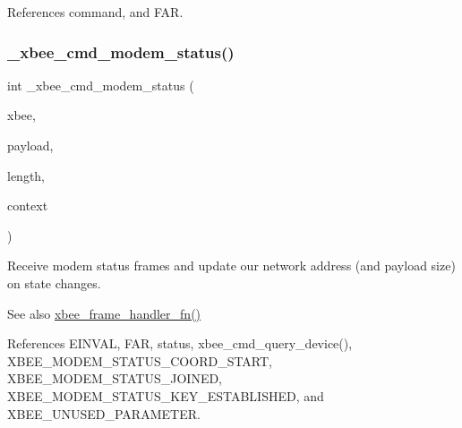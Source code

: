 References command, and F\+AR.

\mbox{\label{group__xbee__atcmd_ga9b0ddf7aae7599dc334304f2b642f05f}} 
\subsubsection{\texorpdfstring{\+\_\+xbee\+\_\+cmd\+\_\+modem\+\_\+status()}{\_xbee\_cmd\_modem\_status()}}
{\footnotesize\ttfamily int \+\_\+xbee\+\_\+cmd\+\_\+modem\+\_\+status (\begin{DoxyParamCaption}\item[{\hyperlink{structxbee__dev__t}{xbee\+\_\+dev\+\_\+t} $\ast$}]{xbee,  }\item[{const void \hyperlink{group__hal_gaef060b3456fdcc093a7210a762d5f2ed}{F\+AR} $\ast$}]{payload,  }\item[{\hyperlink{group__hal__dos_ga5a8b2dc9e45a9ee81a94ef304fb62505}{uint16\+\_\+t}}]{length,  }\item[{void \hyperlink{group__hal_gaef060b3456fdcc093a7210a762d5f2ed}{F\+AR} $\ast$}]{context }\end{DoxyParamCaption})}



Receive modem status frames and update our network address (and payload size) on state changes. 

\begin{DoxySeeAlso}{See also}
\hyperlink{group__xbee__device_ga3e6f2b540e8cec7a69ef0b0166da14ff}{xbee\+\_\+frame\+\_\+handler\+\_\+fn()} 
\end{DoxySeeAlso}


References E\+I\+N\+V\+AL, F\+AR, status, xbee\+\_\+cmd\+\_\+query\+\_\+device(), X\+B\+E\+E\+\_\+\+M\+O\+D\+E\+M\+\_\+\+S\+T\+A\+T\+U\+S\+\_\+\+C\+O\+O\+R\+D\+\_\+\+S\+T\+A\+RT, X\+B\+E\+E\+\_\+\+M\+O\+D\+E\+M\+\_\+\+S\+T\+A\+T\+U\+S\+\_\+\+J\+O\+I\+N\+ED, X\+B\+E\+E\+\_\+\+M\+O\+D\+E\+M\+\_\+\+S\+T\+A\+T\+U\+S\+\_\+\+K\+E\+Y\+\_\+\+E\+S\+T\+A\+B\+L\+I\+S\+H\+ED, and X\+B\+E\+E\+\_\+\+U\+N\+U\+S\+E\+D\+\_\+\+P\+A\+R\+A\+M\+E\+T\+ER.

\mbox{\label{group__xbee__atcmd_ga899d5ef84ca5790c3c76b965f88874e0}} 

